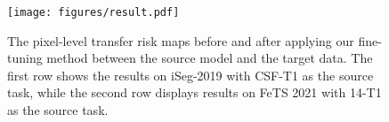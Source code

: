 \begin{figure}
    \vspace{-0.4cm}
    \centering
    \texttt{[image: figures/result.pdf]}
    \caption{The pixel-level transfer risk maps before and after applying our fine-tuning method between the source model and the target data. The first row shows the results on iSeg-2019 with CSF-T1 as the source task, while the second row displays results on FeTS 2021 with 14-T1 as the source task.
    }
    \label{transferability}
    \vspace{-0.4cm}
\end{figure}